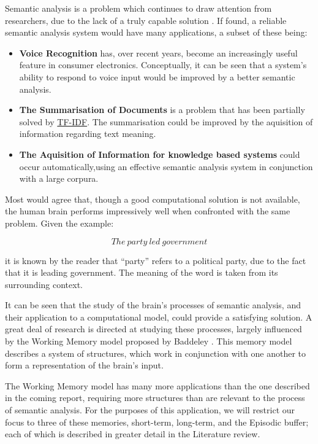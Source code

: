 \documentclass[]{article}
\begin{document}
Semantic analysis is a problem which continues to draw attention from researchers, due to the lack of a truly capable solution \cite{NLPHandbook}. If found, a reliable semantic analysis system would have many applications, a subset of these being:

\begin{itemize}
	\item \textbf{Voice Recognition} has, over recent years, become an increasingly useful feature in consumer electronics. Conceptually, it can be seen that a system's ability to respond to voice input would be improved by a better semantic analysis.
	
	\item \textbf{The Summarisation of Documents} is a problem that has been partially solved by \hyperref[sec:TFIDF]{TF-IDF}. The summarisation could be improved by the aquisition of information regarding text meaning.
	 
	\item \textbf{The Aquisition of Information for knowledge based systems} could occur automatically,using an effective semantic analysis system in conjunction with a large corpura.
\end{itemize}

Most would agree that, though a good computational solution is not available, the human brain performs impressively well when confronted with the same problem. Given the example:

\[The\: party\: led\: government\]

it is known by the reader that “party” refers to a political party, due to the fact that it is leading government. The meaning of the word is taken from its surrounding context.

It can be seen that the study of the brain's processes of semantic analysis, and their application to a computational model, could provide a satisfying solution. A great deal of research is directed at studying these processes, largely influenced by the Working Memory model proposed by Baddeley \cite{MemoryBaddeleyEysenkAnderson}. This memory model describes a system of structures, which work in conjunction with one another to form a representation of the brain’s input. 

The Working Memory model has many more applications than the one described in the coming report, requiring more structures than are relevant to the process of semantic analysis. For the purposes of this application, we will restrict our focus to three of these memories, short-term, long-term, and the Episodic buffer\cite{MemoryBaddeleyEysenkAnderson}; each of which is described in greater detail in the Literature review.
\end{document}
